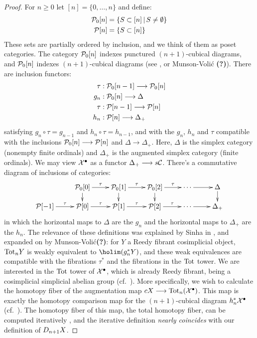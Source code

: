 \documentclass[11pt]{amsart}
\theoremstyle{plain}
\newcommand{\dupdown}[2]{D_{\smash{#1}}}
\begin{document}
\begin{proof}
For $n\geq0$ let $[n]=\{0,\ldots,n\}$ and define:
\begin{alignat*}{2}
\calP_0[n]
&=
\left\{S\subset [n]\,\middle|\, S\neq\emptyset\right\}%
\\
\calP[n]
&=
\left\{S\subset [n]\right\}%
\end{alignat*}
These sets are partially ordered by inclusion, and we think of them as poset categories. The category $\mathcal{P}_0[n]$ indexes punctured $(n+1)$-cubical diagrams, and $\mathcal{P}_0[n]$ indexes $(n+1)$-cubical diagrams (see \cite{GoodwillieCalcII}, \cite{LuisGoodwillie.pdf} or Munson-Voli\'c \textbf{(?)}). There are inclusion functors:
\begin{alignat*}{2}
\tau
&:
\calP_0[n-1]\to \calP_0[n]%
\\
g_n
&:
\calP_0[n]\to \Delta
\\
\tau
&:
\calP[n-1]\to \calP[n]%
\\
h_n
&:
\calP[n]\to \Delta_+
\end{alignat*}
satisfying $g_n\circ \tau=g_{n-1}$ and $h_n\circ \tau=h_{n-1}$, and with the $g_n$, $h_n$ and $\tau$ compatible with the inclusions $\mathcal{P}_0[n]\longrightarrow \mathcal{P}[n]$ and $\Delta\to\Delta_+$. Here, $\Delta$ is the simplex category (nonempty finite ordinals) and $\Delta_+$ is the augmented simplex category (finite ordinals). We may view $\mathcal{X}^\bullet$ as a functor $\Delta_+\longrightarrow s\mathcal{C}$. There's a commutative diagram of inclusions of categories:
\[\xymatrix@R=4mm{
&%
\calP_0[0]\ar[r]^-{\tau}\ar[d]
&%
\calP_0[1]\ar[r]^-{\tau}\ar[d]
&%
\calP_0[2]\ar[r]^-{\tau}\ar[d]
&%
\cdots \ar[r]
&%
\Delta\ar[d]\\
\calP[-1]\ar[r]^-{\tau}
&%
\calP[0]\ar[r]^-{\tau}
&%
\calP[1]\ar[r]^-{\tau}
&%
\calP[2]\ar[r]^-{\tau}
&%
\cdots \ar[r]
&%
\Delta_+
}\]
in which the horizontal maps to $\Delta$ are the $g_n$ and the horizontal maps to $\Delta_+$ are the $h_n$. The relevance of these definitions was explained by Sinha in \cite[Theorem 6.5]{SinhaSpacesOfKnots.pdf}, and expanded on by Munson-Voli\'c\textbf{(?)}: for $Y$ a Reedy fibrant cosimplicial object, $\textup{Tot}_nY$ is weakly equivalent to $\holim(g_n^*Y)$, and these weak equivalences are compatible with the fibrations $\tau^*$ and the fibrations in the $\textup{Tot}$ tower.
We are interested in the $\textup{Tot}$ tower of $\mathcal{X}^\bullet$, which is already Reedy fibrant, being a cosimplicial simplicial abelian group (cf.\ \cite[{X.4.9}]{YellowMonster}).
More specifically, we wish to calculate the homotopy fiber of the augmentation map $cX\longrightarrow\textup{Tot}_{n}(\mathcal{X}^\bullet)$. This map is exactly the homotopy comparison map for the $(n+1)$-cubical diagram $h_{n}^*\mathcal{X}^\bullet$ (cf.\ \cite[\S3]{LuisGoodwillie.pdf}). The homotopy fiber of this map, the total homotopy fiber, can be computed iteratively \cite[Proposition 3.8]{LuisGoodwillie.pdf}, and the iterative definition \emph{nearly coincides} with our definition of $\dupdown{n+1}{c}X$.


\end{proof}
\end{document}

